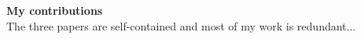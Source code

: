 
\noindent
{\bf My contributions}\\
\noindent
The three papers are self-contained and most of my work is redundant...
